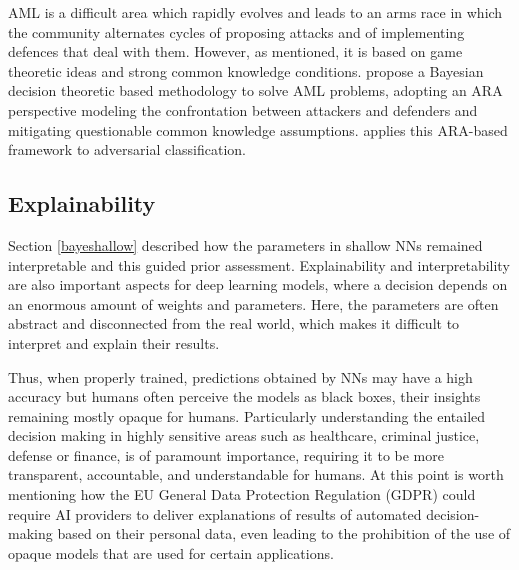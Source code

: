 AML is a  difficult area which rapidly evolves and leads to an 
arms race in which the community alternates cycles of proposing attacks and  of implementing defences that deal with them. However, as mentioned, it is 
based on game theoretic ideas and strong common
knowledge conditions. 
\cite{AMLARA} propose a
Bayesian decision theoretic based methodology 
to solve AML problems, 
adopting an ARA perspective \cite{adversarialRiskAnalysis2009,banks2015adversarial} modeling the confrontation between attackers and defenders and mitigating questionable common knowledge assumptions. \cite{math8111957} applies this ARA-based framework to  adversarial classification.

\subsection{Explainability}

Section \ref{bayeshallow} described how the parameters 
in shallow NNs remained interpretable and this  guided
prior assessment. Explainability and interpretability are also important aspects for deep learning models,
where a decision depends on an enormous amount of weights and parameters. Here, the parameters are often abstract and disconnected from the real world, which makes it difficult to interpret and explain their results.


Thus, when properly trained, predictions obtained by
NNs may have a high accuracy but humans
often perceive the models as black boxes, their insights
remaining mostly
opaque for humans. Particularly understanding 
the entailed decision making in highly sensitive
areas such as healthcare, criminal justice, defense or finance, is of paramount importance,
requiring it to be more transparent, accountable, and understandable
for humans.
At this point is worth mentioning how the 
EU General Data Protection Regulation (GDPR) could require AI providers to deliver explanations of results of automated decision-making based on their personal data, even leading to the prohibition of the use of opaque models that are used for certain applications.

